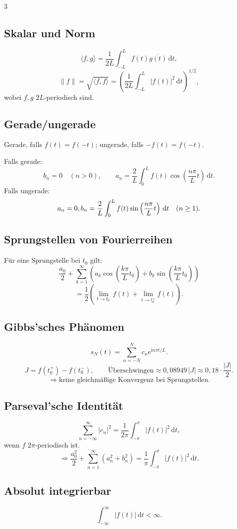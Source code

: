 \documentclass[a4paper,landscape]{article}
\newcommand{\dd}{\,\mathrm d}
\newcommand{\ee}{\mathrm e}
\newcommand{\ii}{\mathrm i}
\begin{document}
\begin{multicols*}{3}
\subsection*{Skalar und Norm}
\[
\langle f,g\rangle=\frac1{2L}\int_{-L}^{L}f(t)\overline{g(t)}\dd t,
\]
\[
\|f\|=\sqrt{\langle f,f\rangle}=\left(\frac1{2L}\int_{-L}^{L}|f(t)|^2\dd t\right)^{1/2},
\]
wobei $f,g$ $2L$-periodisch sind.

\subsection*{Gerade/ungerade}
Gerade, falls $f(t)=f(-t)$; ungerade, falls $-f(t)=f(-t)$.

Falls gerade:
\[
b_n=0\quad(n>0),\qquad a_n=\frac2L\int_0^L f(t)\cos\left(\frac{n\pi}{L}t\right)\dd t.
\]
Falls ungerade:
\[
a_n=0,\\
b_n=\frac2L\int_0^L f(t)\sin\left(\frac{n\pi}{L}t\right)\dd t\quad(n\ge1).
\]

\subsection*{Sprungstellen von Fourierreihen}
Für eine Sprungstelle bei $t_0$ gilt:
\[
\frac{a_0}{2}+\sum_{k=1}^{\infty}\left(a_k\cos\left(\frac{k\pi}{L}t_0\right)+b_k\sin\left(\frac{k\pi}{L}t_0\right)\right)
\]
\[
=\frac12\left(\lim_{t\to t_0^-}f(t)+\lim_{t\to t_0^+}f(t)\right).
\]

\subsection*{Gibbs'sches Phänomen}
\[
s_N(t)=\sum_{n=-N}^{N}c_n\ee^{\ii n\pi t/L}.
\]
\[
J=f(t_0^+)-f(t_0^-),\qquad \text{Überschwingen}\approx 0{,}08949\,|J|\approx0{,}18\cdot\frac{|J|}{2}.
\]
\[
\Rightarrow \text{keine gleichmäßige Konvergenz bei Sprungstellen}.
\]

\subsection*{Parseval'sche Identität}
\[
\sum_{n=-\infty}^{\infty}|c_n|^2=\frac1{2\pi}\int_{-\pi}^{\pi}|f(t)|^2\dd t,
\]
wenn $f$ $2\pi$-periodisch ist.
\[
\Rightarrow \frac{a_0^2}{2}+\sum_{n=1}^{\infty}(a_n^2+b_n^2)=\frac1\pi\int_{-\pi}^{\pi}|f(t)|^2\dd t.
\]

\subsection*{Absolut integrierbar}
\[
\int_{-\infty}^{\infty}|f(t)|\dd t<\infty.
\]


\end{multicols*}
\end{document}
